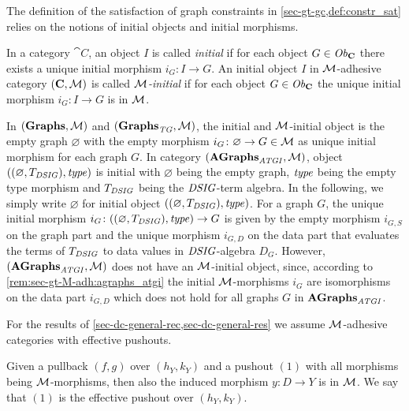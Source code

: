 The definition of the satisfaction of graph constraints in \cref{sec-gt-gc,def:constr_sat} relies on the notions of initial objects and initial morphisms.

\begin{definition}
In a category $\cat{C}$, an object $I$ is called \emph{initial} if for each object $G \in \mathit{Ob}_\mathbf{C}$ there exists a unique initial morphism $i_G\colon I \to G$.
An initial object $I$ in ${\cal M}$-adhesive category $(\mathbf{C},{\cal M})$ is called \emph{${\cal M}$-initial} if for each object $G \in \mathit{Ob}_\mathbf{C}$ the unique initial morphism $i_G\colon I \to G$ is in ${\cal M}$.
\envEndMarker
\end{definition}

\begin{remark}
In $(\mathbf{Graphs},{\cal M})$ and $(\mathbf{Graphs}_\mathit{TG},{\cal M})$, the initial and ${\cal M}$-initial object is the empty graph $\varnothing$ with the empty morphism $i_G\colon \varnothing \to G \in {\cal M}$ as unique initial morphism for each graph $G$.
In category $(\mathbf{AGraphs}_\mathit{ATGI},{\cal M})$, object $((\varnothing,T_\mathit{DSIG}),\mathit{type})$ is initial with $\varnothing$ being the empty graph, $\mathit{type}$ being the empty type morphism and $T_\mathit{DSIG}$ being the $\mathit{DSIG}$-term algebra.
In the following, we simply write $\varnothing$ for initial object $((\varnothing,T_\mathit{DSIG}),\mathit{type})$.
For a graph $G$, the unique initial morphism $i_G\colon ((\varnothing,T_\mathit{DSIG}),\mathit{type}) \to G$ is given by the empty morphism $i_{G,S}$ on the graph part and the unique  morphism $i_{G,D}$ on the data part that evaluates the terms of $T_\mathit{DSIG}$ to data values in $\mathit{DSIG}$-algebra $D_G$.
However, $(\mathbf{AGraphs}_\mathit{ATGI},{\cal M})$ does not have an ${\cal M}$-initial object, since, according to \cref{rem:sec-gt-M-adh:agraphs_atgi} the initial ${\cal M}$-morphisms $i_G$ are isomorphisms on the data part $i_{G,D}$ which does not hold for all graphs $G$ in $\mathbf{AGraphs}_\mathit{ATGI}$.
\envEndMarker
\end{remark}

For the results of \cref{sec-dc-general-rec,sec-dc-general-res} we assume ${\cal M}$-adhesive categories with effective pushouts.

\begin{definition}
Given a pullback $(f,g)$ over $(h_Y,k_Y)$ and a pushout $(1)$ with all morphisms being ${\cal M}$-morphisms, then also the induced morphism $y\colon D \to Y$ is in ${\cal M}$.
We say that $(1)$ is the effective pushout over $(h_Y,k_Y)$.
\envEndMarker
\end{definition}

